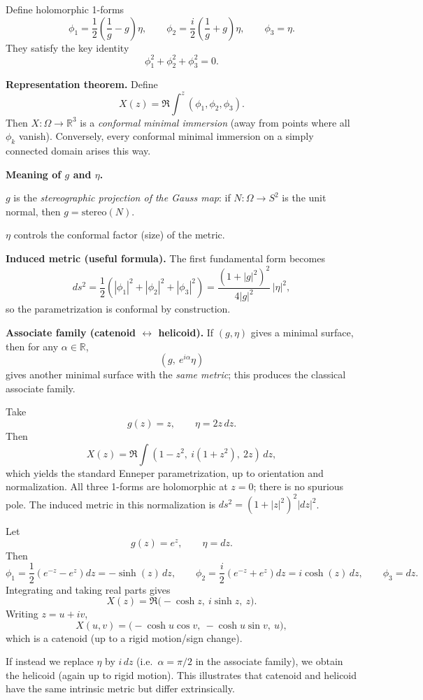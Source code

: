 \begin{problem}[CP-IV-0044]
	Define holomorphic 1-forms
	\[
	\phi_1=\frac12\left(\frac{1}{g}-g\right)\eta,\qquad
	\phi_2=\frac{i}{2}\left(\frac{1}{g}+g\right)\eta,\qquad
	\phi_3=\eta.
	\]
	They satisfy the key identity
	\[
	\phi_1^2+\phi_2^2+\phi_3^2=0.
	\]

	\medskip
	\textbf{Representation theorem.}
	Define
	\[
	X(z)=\Re\int^z (\phi_1,\phi_2,\phi_3).
	\]
	Then $X:\Omega\to\mathbb{R}^3$ is a \emph{conformal minimal immersion} (away from points where all $\phi_k$ vanish).
	Conversely, every conformal minimal immersion on a simply connected domain arises this way.

	\medskip
	\textbf{Meaning of $g$ and $\eta$.}

		\par\noindent\textbullet\quad $g$ is the \emph{stereographic projection of the Gauss map}:
		if $N:\Omega\to S^2$ is the unit normal, then $g=\mathrm{stereo}(N)$.
		\par\noindent\textbullet\quad $\eta$ controls the conformal factor (size) of the metric.

	\medskip
	\textbf{Induced metric (useful formula).}
	The first fundamental form becomes
	\[
	ds^2 = \frac12\left(|\phi_1|^2+|\phi_2|^2+|\phi_3|^2\right)
	= \frac{(1+|g|^2)^2}{4|g|^2}\,|\eta|^2,
	\]
	so the parametrization is conformal by construction.

	\medskip
	\textbf{Associate family (catenoid $\leftrightarrow$ helicoid).}
	If $(g,\eta)$ gives a minimal surface, then for any $\alpha\in\mathbb{R}$,
	\[
	(g,\ e^{i\alpha}\eta)
	\]
	gives another minimal surface with the \emph{same metric}; this produces the classical associate family.

	\bigskip

	Take
	\[
	g(z)=z,\qquad \eta = 2z\,dz.
	\]
	Then
	\[
	X(z)=\Re\int \left(1-z^2,\ i(1+z^2),\ 2z\right)\,dz,
	\]
	which yields the standard Enneper parametrization, up to orientation
	and normalization. All three 1-forms are holomorphic at $z=0$;
	there is no spurious pole. The induced metric in this normalization is
	$ds^2=(1+|z|^2)^2|dz|^2$.

	\bigskip

	Let
	\[
	g(z)=e^{z},\qquad \eta=dz.
	\]
	Then
	\[
	\phi_1=\frac12(e^{-z}-e^{z})dz=-\sinh(z)\,dz,\qquad
	\phi_2=\frac{i}{2}(e^{-z}+e^{z})dz=i\cosh(z)\,dz,\qquad
	\phi_3=dz.
	\]
	Integrating and taking real parts gives
	\[
	X(z)=\Re\bigl(-\cosh z,\ i\sinh z,\ z\bigr).
	\]
	Writing $z=u+iv$,
	\[
	X(u,v)=\bigl(-\cosh u\cos v,\ -\cosh u\sin v,\ u\bigr),
	\]
	which is a catenoid (up to a rigid motion/sign change).

	If instead we replace $\eta$ by $i\,dz$ (i.e.\ $\alpha=\pi/2$ in the associate family),
	we obtain the helicoid (again up to rigid motion). This illustrates that catenoid and helicoid have the same
	intrinsic metric but differ extrinsically.
\end{problem}

